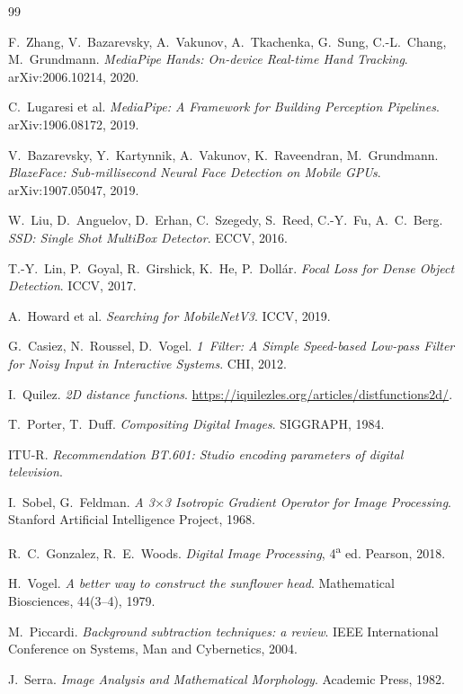 \documentclass[11pt,a4paper]{article}
\begin{document}
\begin{thebibliography}{99}

F.~Zhang, V.~Bazarevsky, A.~Vakunov, A.~Tkachenka, G.~Sung, C.-L.~Chang, M.~Grundmann.
\newblock \emph{MediaPipe Hands: On-device Real-time Hand Tracking}.
\newblock arXiv:2006.10214, 2020.

C.~Lugaresi et al.
\newblock \emph{MediaPipe: A Framework for Building Perception Pipelines}.
\newblock arXiv:1906.08172, 2019.

V.~Bazarevsky, Y.~Kartynnik, A.~Vakunov, K.~Raveendran, M.~Grundmann.
\newblock \emph{BlazeFace: Sub-millisecond Neural Face Detection on Mobile GPUs}.
\newblock arXiv:1907.05047, 2019.

W.~Liu, D.~Anguelov, D.~Erhan, C.~Szegedy, S.~Reed, C.-Y.~Fu, A.~C.~Berg.
\newblock \emph{SSD: Single Shot MultiBox Detector}.
\newblock ECCV, 2016.

T.-Y.~Lin, P.~Goyal, R.~Girshick, K.~He, P.~Doll\'ar.
\newblock \emph{Focal Loss for Dense Object Detection}.
\newblock ICCV, 2017.

A.~Howard et al.
\newblock \emph{Searching for MobileNetV3}.
\newblock ICCV, 2019.

G.~Casiez, N.~Roussel, D.~Vogel.
\newblock \emph{1\,\texteuro{} Filter: A Simple Speed-based Low-pass Filter for Noisy Input in Interactive Systems}.
\newblock CHI, 2012.

I.~Quilez.
\newblock \emph{2D distance functions}.
\newblock \url{https://iquilezles.org/articles/distfunctions2d/}.

T.~Porter, T.~Duff.
\newblock \emph{Compositing Digital Images}.
\newblock SIGGRAPH, 1984.

ITU-R.
\newblock \emph{Recommendation BT.601: Studio encoding parameters of digital television}.

I.~Sobel, G.~Feldman.
\newblock \emph{A 3$\times$3 Isotropic Gradient Operator for Image Processing}.
\newblock Stanford Artificial Intelligence Project, 1968.

R.~C.~Gonzalez, R.~E.~Woods.
\newblock \emph{Digital Image Processing}, 4\textsuperscript{a} ed.
\newblock Pearson, 2018.

H.~Vogel.
\newblock \emph{A better way to construct the sunflower head}.
\newblock Mathematical Biosciences, 44(3--4), 1979.

M.~Piccardi.
\newblock \emph{Background subtraction techniques: a review}.
\newblock IEEE International Conference on Systems, Man and Cybernetics, 2004.

J.~Serra.
\newblock \emph{Image Analysis and Mathematical Morphology}.
\newblock Academic Press, 1982.

\end{thebibliography}
\end{document}
